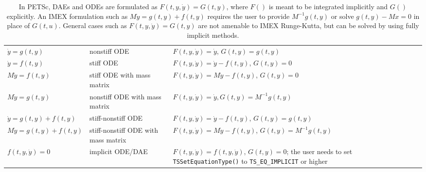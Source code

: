 %
\begin{table}
\centering
\begin{tabular}{lp{1.7in}p{2.8in}}
\hline
$\dot{y}=g(t,y)$ & nonstiff ODE & $F(t,y,\dot{y}) = \dot{y}$,
$G(t,y)=g(t,y)$\\
$\dot{y}=f(t,y)$ & stiff ODE & $F(t,y,\dot{y}) =  \dot{y}-f(t,y)$,
$G(t,y)=0$\\
$M \dot{y}=f(t,y)$ & stiff ODE with mass matrix& $F(t,y,\dot{y}) = M \dot{y}-f(t,y)$,
$G(t,y)=0$\\
$M \dot{y} = g(t,y)$& nonstiff ODE with mass matrix&$F(t,y,\dot{y}) = \dot{y}, G(t,y) = M^{-1} g(t,y)$\\
$\dot{y}=g(t,y)+f(t,y)$ & stiff-nonstiff ODE & $F(t,y,\dot{y}) = \dot{y}-f(t,y)$, $G(t,y)=g(t,y)$\\
$M\dot{y}=g(t,y)+f(t,y)$ & stiff-nonstiff ODE with mass matrix & $F(t,y,\dot{y}) = M \dot{y}-f(t,y)$, $G(t,y)=M^{-1}g(t,y)$\\
  $f(t,y,\dot{y})=0$       & implicit ODE/DAE                  & $F(t,y,\dot{y}) = f(t,y,\dot{y})$, $G(t,y) = 0$; the user needs to set \lstinline|TSSetEquationType()| to \lstinline|TS_EQ_IMPLICIT| or higher\\
\hline
\end{tabular}
\caption{\label{tab_DE_forms}In PETSc, DAEs and ODEs are formulated
as $F(t,y,\dot{y})=G(t,y)$, where $F()$ is meant to be integrated
implicitly and $G()$ explicitly. An IMEX formulation such as
$M\dot{y}=g(t,y)+f(t,y)$ requires the user to provide $M^{-1} g(t,y)$ or
solve  $g(t,y) - M x=0$ in place of $G(t,u)$. General cases such as
$F(t,y,\dot{y})=G(t,y)$ are
not amenable to IMEX Runge-Kutta, but can be solved by using fully implicit methods.}

\end{table}

